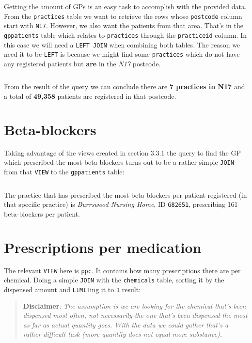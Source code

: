 \documentclass[english,a4paper,]{report}
\begin{document}
Getting the amount of GPs is an easy task to accomplish with the
provided data. From the \texttt{practices} table we want to retrieve the
rows whose \texttt{postcode} column start with \texttt{N17}. However, we
also want the patients from that area. That's in the \texttt{gppatients}
table which relates to \texttt{practices} through the
\texttt{practiceid} column. In this case we will need a
\texttt{LEFT\ JOIN} when combining both tables. The reason we need it to
be \texttt{LEFT} is because we might find some \texttt{practices} which
do not have any registered patients but \textbf{are} in the \emph{N17}
postcode.

\inputminted[firstline=5,lastline=15]{sql}{src/sql/02-queries.sql}

From the result of the query we can conclude there are \textbf{7
practices in N17} and a total of \textbf{49,358} patients are registered
in that postcode.

\section{Beta-blockers}\label{beta-blockers-1}

Taking advantage of the views created in section 3.3.1 the query to find
the GP which prescribed the most beta-blockers turns out to be a rather
simple \texttt{JOIN} from that \texttt{VIEW} to the \texttt{gppatients}
table:

\inputminted[firstline=27,lastline=39]{sql}{src/sql/02-queries.sql}

The practice that has prescribed the most beta-blockers per patient
registered (in that specific practice) is \emph{Burrswood Nursing Home},
ID \texttt{G82651}, prescribing 161 beta-blockers per patient.

\section{Prescriptions per
medication}\label{prescriptions-per-medication}

The relevant \texttt{VIEW} here is \texttt{ppc}. It contains how many
prescriptions there are per chemical. Doing a simple \texttt{JOIN} with
the \texttt{chemicals} table, sorting it by the dispensed amount and
\texttt{LIMIT}ing it to \texttt{1} result:

\begin{quote}
\textbf{Disclaimer}: \emph{The assumption is we are looking for the
chemical that's been dispensed most often, not necessarily the one
that's been dispensed the most as far as actual quantity goes. With the
data we could gather that's a rather difficult task (more quantity does
not equal more substance).}
\end{quote}
\end{document}
